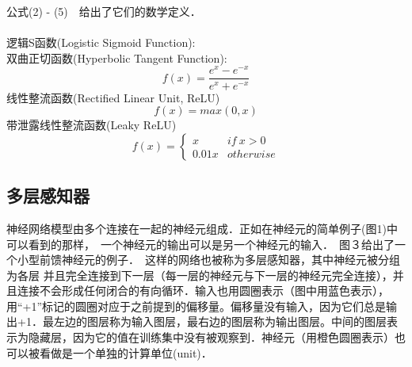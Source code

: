 \documentclass[12pt]{article}
\begin{document}
\begin{CJK*}{UTF8}{gbsn}
公式(2) - (5)　给出了它们的数学定义．\\
\\
逻辑S函数(Logistic Sigmoid Function):
\begin{equation} \label{eq:sigmoid}
\end{equation}
双曲正切函数(Hyperbolic Tangent Function):
\begin{equation} \label{eq:tanh}
f(x) = \frac{e^x-e^{-x}}{e^x+e^{-x}}
\end{equation}
线性整流函数(Rectified Linear Unit,    ReLU)
\begin{equation} \label{eq:relu}
f(x) = max(0,   x)
\end{equation}
带泄露线性整流函数(Leaky ReLU)
\begin{equation}
f(x) = 
\left\{
\begin{array}{rl}
x&if\ x > 0\\
0.01x&otherwise
\end{array}
\right.
\end{equation}

\subsection{多层感知器}

神经网络模型由多个连接在一起的神经元组成．正如在神经元的简单例子(图1)中可以看到的那样，　一个神经元的输出可以是另一个神经元的输入．　图３给出了一个小型前馈神经元的例子．　这样的网络也被称为多层感知器，其中神经元被分组为各层
并且完全连接到下一层（每一层的神经元与下一层的神经元完全连接），并且连接不会形成任何闭合的有向循环．输入也用圆圈表示（图中用蓝色表示），用“+1”标记的圆圈对应于之前提到的偏移量。偏移量没有输入，因为它们总是输出+1．最左边的图层称为输入图层，最右边的图层称为输出图层。中间的图层表示为隐藏层，因为它的值在训练集中没有被观察到．神经元（用橙色圆圈表示）也可以被看做是一个单独的计算单位(unit)．　


\end{CJK*}
\end{document}
